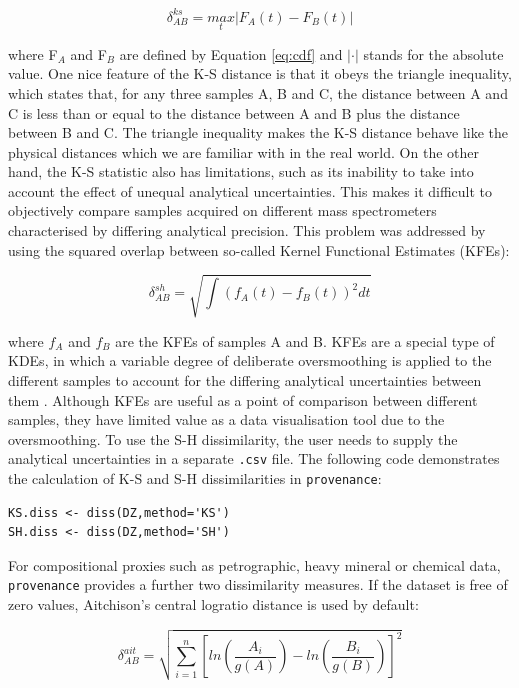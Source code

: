 \documentclass{article}
\begin{document}
\begin{equation}
\delta^{ks}_{AB} = \underset{t}{max}|F_A(t)-F_B(t)|
\label{eq:ks}
\end{equation}

where F$_A$ and F$_B$ are defined by Equation \ref{eq:cdf} and
$|\cdot|$ stands for the absolute value.  One nice feature of the K-S
distance is that it obeys the triangle inequality, which states that,
for any three samples A, B and C, the distance between A and C is less
than or equal to the distance between A and B plus the distance
between B and C. The triangle inequality makes the K-S distance behave
like the physical distances which we are familiar with in the real
world.  On the other hand, the K-S statistic also has limitations,
such as its inability to take into account the effect of unequal
analytical uncertainties. This makes it difficult to objectively
compare samples acquired on different mass spectrometers characterised
by differing analytical precision. This problem was addressed by
\citet{sircombe2004a} using the squared overlap between so-called
Kernel Functional Estimates (KFEs):

\begin{equation}
\delta^{sh}_{AB} = \sqrt{\int\left(f_A(t)-f_B(t)\right)^2dt}
\label{eq:sh}
\end{equation}

where $f_A$ and $f_B$ are the KFEs of samples A and B. KFEs are a
special type of KDEs, in which a variable degree of deliberate
oversmoothing is applied to the different samples to account for the
differing analytical uncertainties between them
\citep{sircombe2004a}. Although KFEs are useful as a point of
comparison between different samples, they have limited value as a
data visualisation tool due to the oversmoothing. To use the S-H
dissimilarity, the user needs to supply the analytical uncertainties
in a separate {\tt .csv} file. The following code demonstrates the
calculation of K-S and S-H dissimilarities in {\tt provenance}:

\begin{verbatim}
KS.diss <- diss(DZ,method='KS')
SH.diss <- diss(DZ,method='SH')
\end{verbatim}

For compositional proxies such as petrographic, heavy mineral or
chemical data, {\tt provenance} provides a further two dissimilarity
measures. If the dataset is free of zero values, Aitchison's central
logratio distance is used by default:

\begin{equation}
\delta^{ait}_{AB} = \sqrt{\sum\limits_{i=1}^{n} \left[
ln\left(\frac{A_i}{g(A)}\right) - ln\left(\frac{B_i}{g(B)}\right)
\right]^2}
\label{eq:aitchison}
\end{equation}
\end{document}
